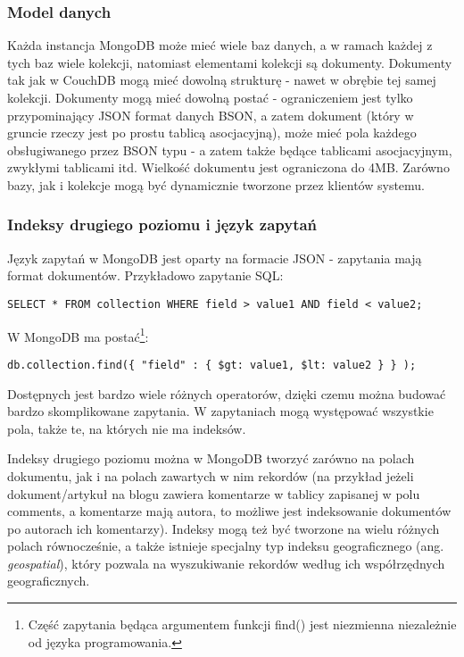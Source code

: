 \subsubsection*{Model danych}

Każda instancja MongoDB może mieć wiele baz danych, a w ramach każdej z tych baz wiele kolekcji, natomiast elementami kolekcji są dokumenty.
Dokumenty tak jak w CouchDB mogą mieć dowolną strukturę - nawet w obrębie tej samej kolekcji.
Dokumenty mogą mieć dowolną postać - ograniczeniem jest tylko przypominający JSON format danych BSON, a zatem dokument (który w gruncie rzeczy jest po prostu tablicą asocjacyjną), może mieć pola każdego obsługiwanego przez BSON typu - a zatem także będące tablicami asocjacyjnym, zwykłymi tablicami itd.
Wielkość dokumentu jest ograniczona do 4MB.
Zarówno bazy, jak i kolekcje mogą być dynamicznie tworzone przez klientów systemu.

\subsubsection*{Indeksy drugiego poziomu i język zapytań}

Język zapytań w MongoDB jest oparty na formacie JSON - zapytania mają format dokumentów. Przykładowo zapytanie SQL:

\begin{verbatim}
SELECT * FROM collection WHERE field > value1 AND field < value2;
\end{verbatim}

W MongoDB ma postać\footnote{Część zapytania będąca argumentem funkcji find() jest niezmienna niezależnie od języka programowania.}:

\begin{verbatim}
db.collection.find({ "field" : { $gt: value1, $lt: value2 } } );
\end{verbatim}

Dostępnych jest bardzo wiele różnych operatorów, dzięki czemu można budować bardzo skomplikowane zapytania.
W zapytaniach mogą występować wszystkie pola, także te, na których nie ma indeksów.

Indeksy drugiego poziomu można w MongoDB tworzyć zarówno na polach dokumentu, jak i na polach zawartych w nim rekordów (na przykład jeżeli dokument/artykuł na blogu zawiera komentarze w tablicy zapisanej w polu comments, a komentarze mają autora, to możliwe jest indeksowanie dokumentów po autorach ich komentarzy).
Indeksy mogą też być tworzone na wielu różnych polach równocześnie, a także istnieje specjalny typ indeksu geograficznego (ang. \emph{geospatial}), który pozwala na wyszukiwanie rekordów według ich współrzędnych geograficznych.

